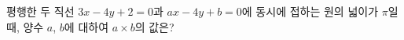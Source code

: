 평행한 두 직선 $3x - 4y + 2 = 0$과 $ax - 4y + b = 0$에 동시에 접하는 원의 넓이가 $\pi$일 때, 양수 $a$, $b$에 대하여 $a \times b$의 값은?

